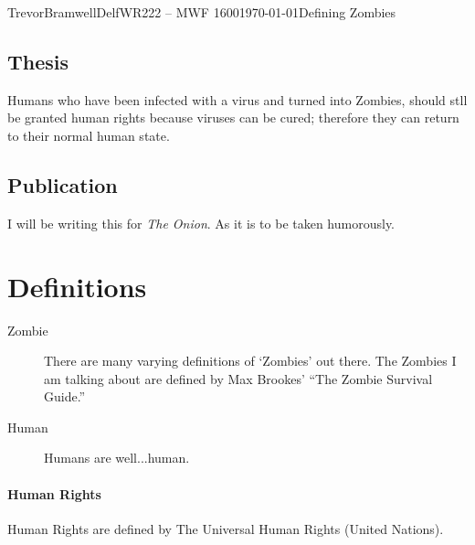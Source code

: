 \documentclass[12pt,letterpaper]{article}
\begin{document}
\begin{mla}{Trevor}{Bramwell}{Delf}{WR222 -- MWF 1600}{\today}{Defining Zombies}

\subsection*{Thesis}
Humans who have been infected with a virus and turned into Zombies, should
stll be granted human rights because viruses can be cured; therefore they can
return to their normal human state.
\subsection*{Publication}
I will be writing this for \emph{The Onion}. As it is to be taken humorously.

\section*{Definitions}
\begin{description}
\item[Zombie]{There are many varying definitions of `Zombies' out there. The Zombies I am
talking about are defined by Max Brookes' ``The Zombie Survival Guide.''}
\item[Human]{Humans are well...human.}
\end{description}



\paragraph{Human Rights}
Human Rights are defined by The Universal Human Rights (United Nations).


\end{mla}
\end{document}
